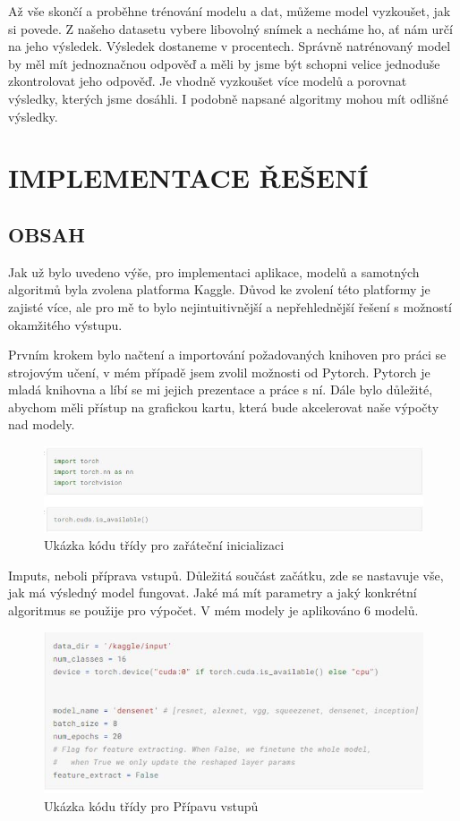 \documentclass[journal]{IEEEtran}
\begin{document}
Až vše skončí a proběhne trénování modelu a dat, můžeme model vyzkoušet, jak si povede. Z našeho datasetu vybere libovolný snímek a necháme ho, ať nám určí na jeho výsledek.  Výsledek dostaneme v procentech. Správně natrénovaný model by měl mít jednoznačnou odpověď a měli by jsme být schopni velice jednoduše zkontrolovat jeho odpověď.
Je vhodně vyzkoušet více modelů a porovnat výsledky, kterých jsme dosáhli. I podobně napsané algoritmy mohou mít odlišné výsledky.
 

\section{IMPLEMENTACE ŘEŠENÍ}
\subsection{OBSAH}
Jak už bylo uvedeno výše, pro implementaci aplikace, modelů a samotných algoritmů byla zvolena platforma Kaggle. Důvod ke zvolení této platformy je zajisté více, ale pro mě to bylo nejintuitivnější a nepřehlednější řešení s možností okamžitého výstupu. 

Prvním krokem bylo načtení a importování požadovaných knihoven pro práci se strojovým učení, v mém případě jsem zvolil možnosti od Pytorch. Pytorch je mladá knihovna a líbí se mi jejich prezentace a práce s ní. Dále bylo důležité, abychom měli přístup na grafickou kartu, která bude akcelerovat naše výpočty nad modely. 

\begin{figure}[h!]
  \includegraphics[width=\linewidth]{images/init.JPG}
  \caption{Ukázka kódu třídy pro zařáteční inicializaci}
\end{figure}

Imputs, neboli příprava vstupů. Důležitá součást začátku, zde se nastavuje vše, jak má výsledný model fungovat. Jaké má mít parametry a jaký konkrétní algoritmus se použije pro výpočet. V mém modely je aplikováno 6 modelů. 

\begin{figure}[h!]
  \includegraphics[width=\linewidth]{images/Imputs.JPG}
  \caption{Ukázka kódu třídy pro Přípavu vstupů}
\end{figure}
\end{document}
